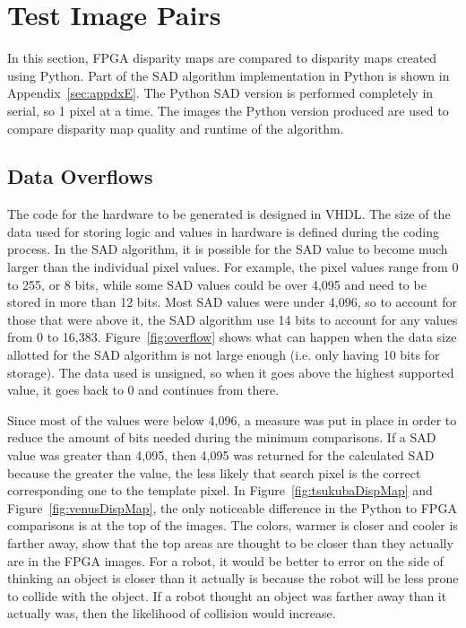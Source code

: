 \section{Test Image Pairs}
\label{sec:runtime}

In this section, FPGA disparity maps are compared to disparity maps created using Python. Part of the SAD algorithm implementation in Python is shown in Appendix~\ref{sec:appdxE}. The Python SAD version is performed completely in serial, so 1 pixel at a time. The images the Python version produced are used to compare disparity map quality and runtime of the algorithm.

\subsection{Data Overflows}
\label{sec:overflow}

The code for the hardware to be generated is designed in VHDL. The size of the data used for storing logic and values in hardware is defined during the coding process. In the SAD algorithm, it is possible for the SAD value to become much larger than the individual pixel values. For example, the pixel values range from 0 to 255, or 8 bits, while some SAD values could be over 4,095 and need to be stored in more than 12 bits. Most SAD values were under 4,096, so to account for those that were above it, the SAD algorithm use 14 bits to account for any values from 0 to 16,383. Figure~\ref{fig:overflow} shows what can happen when the data size allotted for the SAD algorithm is not large enough (i.e. only having 10 bits for storage). The data used is unsigned, so when it goes above the highest supported value, it goes back to 0 and continues from there.

Since most of the values were below 4,096, a measure was put in place in order to reduce the amount of bits needed during the minimum comparisons. If a SAD value was greater than 4,095, then 4,095 was returned for the calculated SAD because the greater the value, the less likely that search pixel is the correct corresponding one to the template pixel. In Figure~\ref{fig:tsukubaDispMap} and Figure~\ref{fig:venusDispMap}, the only noticeable difference in the Python to FPGA comparisons is at the top of the images. The colors, warmer is closer and cooler is farther away, show that the top areas are thought to be closer than they actually are in the FPGA images. For a robot, it would be better to error on the side of thinking an object is closer than it actually is because the robot will be less prone to collide with the object. If a robot thought an object was farther away than it actually was, then the likelihood of collision would increase.

